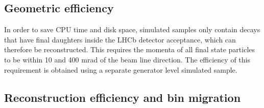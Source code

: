 


\subsection{Geometric efficiency}


In order to save CPU time and disk space, simulated samples only contain decays that have
 final daughters inside the LHCb detector acceptance, which can therefore be reconstructed. 
This requires the momenta of all final state particles to be within 10 and 400 mrad 
of the beam line direction. The efficiency of this requirement is obtained using a separate
generator level simulated sample.

\subsection{Reconstruction efficiency and bin migration}
\label{sec:reco_binmig}

